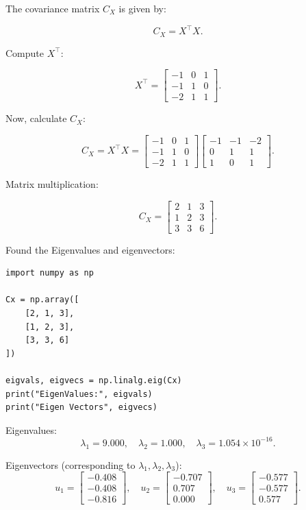 \documentclass{article}
\begin{document}
\begin{enumerate}
    The covariance matrix \( C_X \) is given by:

    \[
    C_X = X^\top X.
    \]

    Compute \( X^\top \):

    \[
    X^\top =
    \begin{bmatrix}
    -1 & 0 & 1 \\
    -1 & 1 & 0 \\
    -2 & 1 & 1
    \end{bmatrix}.
    \]

    Now, calculate \( C_X \):

    \[
    C_X = X^\top X =
    \begin{bmatrix}
    -1 & 0 & 1 \\
    -1 & 1 & 0 \\
    -2 & 1 & 1
    \end{bmatrix}
    \begin{bmatrix}
    -1 & -1 & -2 \\
    0 & 1 & 1 \\
    1 & 0 & 1
    \end{bmatrix}.
    \]

    Matrix multiplication:

    \[
    C_X =
    \begin{bmatrix}
    2 & 1 & 3 \\
    1 & 2 & 3 \\
    3 & 3 & 6
    \end{bmatrix}.
    \]

    Found the Eigenvalues and eigenvectors:
    \begin{verbatim}
import numpy as np

Cx = np.array([
    [2, 1, 3],
    [1, 2, 3],
    [3, 3, 6]
])

eigvals, eigvecs = np.linalg.eig(Cx)
print("EigenValues:", eigvals)
print("Eigen Vectors", eigvecs)
    \end{verbatim}
    Eigenvalues:
     \[
     \lambda_1 = 9.000, \quad \lambda_2 = 1.000, \quad \lambda_3 = 1.054 \times 10^{-16}.
     \]

     Eigenvectors (corresponding to \( \lambda_1, \lambda_2, \lambda_3 \)):
     \[
     u_1 = \begin{bmatrix} -0.408 \\ -0.408 \\ -0.816 \end{bmatrix}, \quad
     u_2 = \begin{bmatrix} -0.707 \\ 0.707 \\ 0.000 \end{bmatrix}, \quad
     u_3 = \begin{bmatrix} -0.577 \\ -0.577 \\ 0.577 \end{bmatrix}.
     \]


\end{enumerate}
\end{document}
